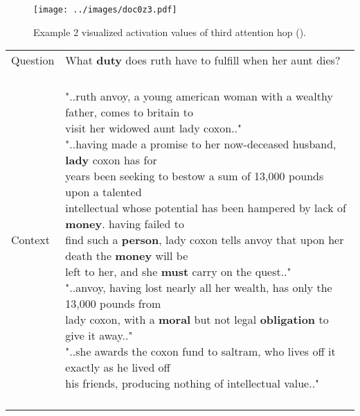 \documentclass[11pt,a4paper]{article}
\begin{document}
\begin{figure*}[h]
  \centering
  \texttt{[image: ../images/doc0z3.pdf]}
 \caption{Example 2 visualized activation values of third attention hop ().}
\end{figure*} \begin{table*}[!h]
	\centering
    \begin{small}
  \begin{tabular}{|p{}|p{}|} 
    \hline
    Question & \makecell[l]{What \textbf{duty} does ruth have to fulfill when her aunt dies?\\} \\
    Context &  \makecell[l]{\\"..ruth anvoy, a young american woman with a wealthy father, comes to britain to \\ visit her widowed aunt lady coxon.."\\
"..having made a promise to her now-deceased husband, \textbf{lady} coxon has for \\ years been seeking to bestow a sum of 13,000 pounds upon a talented \\ intellectual whose potential has been hampered by lack of \textbf{money}. having failed to \\ find such a \textbf{person}, lady coxon tells anvoy that upon her death the \textbf{money} will be \\ left to her, and she \textbf{must} carry on the  quest.."\\
"..anvoy, having lost nearly all her wealth, has only the 13,000 pounds from \\ lady coxon, with a \textbf{moral} but not legal \textbf{obligation} to give it away.."\\
"..she awards the coxon fund to saltram, who lives off it exactly as he lived off \\ his friends, producing nothing of intellectual value.."\\ \\}  \\


\end{tabular}
\end{small}
\end{table*}
\end{document}
